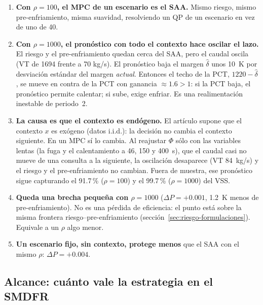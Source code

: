 \begin{enumerate}
  \item \textbf{Con $\rho=100$, el MPC de un escenario es el SAA.} Mismo riesgo, mismo
        pre-enfriamiento, misma suavidad, resolviendo un QP de un escenario en vez de uno de 40.
  \item \textbf{Con $\rho=1000$, el pronóstico con todo el contexto hace oscilar el lazo.} El riesgo
        y el pre-enfriamiento quedan cerca del SAA, pero el caudal oscila (VT de 1694 frente a 70
        kg/s). El pronóstico baja el margen $\hat\delta$ unos 10~K por desviación estándar del
        margen \emph{actual}. Entonces el techo de la PCT, $1220-\hat\delta$, se mueve en contra de
        la PCT con ganancia $\approx1.6>1$: si la PCT baja, el pronóstico permite calentar; si sube,
        exige enfriar. Es una realimentación inestable de periodo~2.
  \item \textbf{La causa es que el contexto es endógeno.} El artículo supone que el contexto $x$
        es exógeno (datos i.i.d.): la decisión no cambia el contexto siguiente. En un MPC sí lo
        cambia. Al reajustar $\Phi$ sólo con las variables lentas (la fuga y el calentamiento a 46,
        150 y 400~s), que el caudal casi no mueve de una consulta a la siguiente, la oscilación
        desaparece (VT 84~kg/s) y el riesgo y el pre-enfriamiento no cambian. Fuera de muestra, ese
        pronóstico sigue capturando el 91.7\,\% ($\rho=100$) y el 99.7\,\% ($\rho=1000$) del VSS.
  \item \textbf{Queda una brecha pequeña con $\rho=1000$} ($\Delta P=+0.001$, 1.2~K menos de
        pre-enfriamiento). No es una pérdida de eficiencia: el punto está sobre la misma frontera
        riesgo--pre-enfriamiento (sección~\ref{sec:riesgo-formulaciones}). Equivale a un $\rho$ algo
        menor.
  \item \textbf{Un escenario fijo, sin contexto, protege menos} que el SAA con el mismo $\rho$:
        $\Delta P=+0.004$.
\end{enumerate}

\subsection{Alcance: cuánto vale la estrategia en el SMDFR}\label{sec:rozas-alcance}
